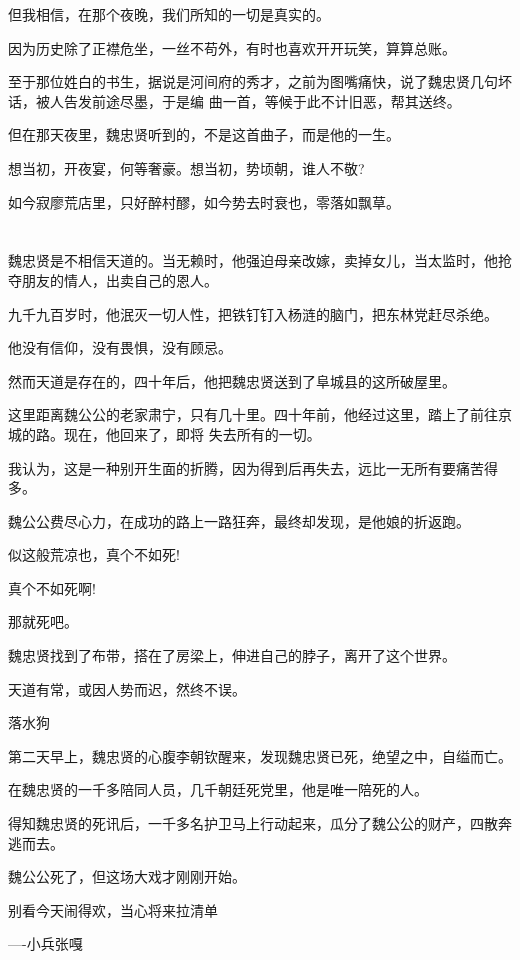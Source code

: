 \documentclass[11pt,a4paper,onecolumn]{article}
\begin{document}
但我相信，在那个夜晚，我们所知的一切是真实的。

因为历史除了正襟危坐，一丝不苟外，有时也喜欢开开玩笑，算算总账。

至于那位姓白的书生，据说是河间府的秀才，之前为图嘴痛快，说了魏忠贤几句坏话，被人告发前途尽墨，于是编
曲一首，等候于此不计旧恶，帮其送终。

但在那天夜里，魏忠贤听到的，不是这首曲子，而是他的一生。

想当初，开夜宴，何等奢豪。想当初，势顷朝，谁人不敬?

如今寂廖荒店里，只好醉村醪，如今势去时衰也，零落如飘草。

\section[\thesection]{}

魏忠贤是不相信天道的。当无赖时，他强迫母亲改嫁，卖掉女儿，当太监时，他抢夺朋友的情人，出卖自己的恩人。

九千九百岁时，他泯灭一切人性，把铁钉钉入杨涟的脑门，把东林党赶尽杀绝。

他没有信仰，没有畏惧，没有顾忌。

然而天道是存在的，四十年后，他把魏忠贤送到了阜城县的这所破屋里。

这里距离魏公公的老家肃宁，只有几十里。四十年前，他经过这里，踏上了前往京城的路。现在，他回来了，即将
失去所有的一切。

我认为，这是一种别开生面的折腾，因为得到后再失去，远比一无所有要痛苦得多。

魏公公费尽心力，在成功的路上一路狂奔，最终却发现，是他娘的折返跑。

似这般荒凉也，真个不如死!

真个不如死啊!

那就死吧。

魏忠贤找到了布带，搭在了房梁上，伸进自己的脖子，离开了这个世界。

天道有常，或因人势而迟，然终不误。

落水狗

第二天早上，魏忠贤的心腹李朝钦醒来，发现魏忠贤已死，绝望之中，自缢而亡。

在魏忠贤的一千多陪同人员，几千朝廷死党里，他是唯一陪死的人。

得知魏忠贤的死讯后，一千多名护卫马上行动起来，瓜分了魏公公的财产，四散奔逃而去。

魏公公死了，但这场大戏才刚刚开始。

别看今天闹得欢，当心将来拉清单

----小兵张嘎
\end{document}
